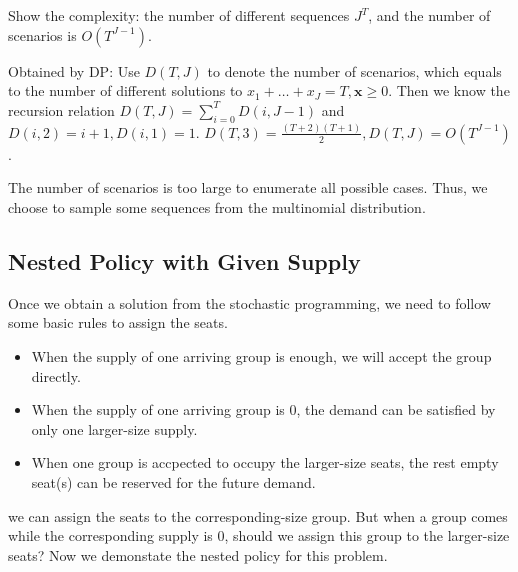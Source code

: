 Show the complexity: the number of different sequences $J^{T}$, and the number of scenarios is $O(T^{J-1})$.

Obtained by DP:
Use $D(T,J) $ to denote the number of scenarios, which equals to the number of different solutions to $x_{1}+\ldots + x_{J} = T, \mathbf{x} \geq 0$.
Then we know the recursion relation $D(T, J) = \sum_{i= 0}^{T} D(i, J-1)$ and $D(i,2) = i+1, D(i,1) = 1$.
$D(T,3) = \frac{(T+2)(T+1)}{2}, D(T,J) = O(T^{J-1})$.

The number of scenarios is too large to enumerate all possible cases.
Thus, we choose to sample some sequences from the multinomial distribution.





\subsection{Nested Policy with Given Supply}\label{nested_policy}

Once we obtain a solution from the stochastic programming, we need to follow some basic rules to assign the seats.
\begin{itemize}
    \item When the supply of one arriving group is enough, we will accept the group directly.
    \item When the supply of one arriving group is 0, the demand can be satisfied by only one larger-size supply.
    \item When one group is accpected to occupy the larger-size seats, the rest empty seat(s) can be reserved for the future demand.
\end{itemize}

we can assign the seats to the corresponding-size group. But when a group comes while the corresponding supply is 0, should we assign this group to the larger-size seats? Now we demonstate the nested policy for this problem.

